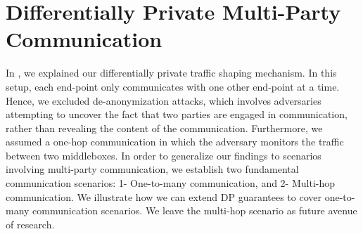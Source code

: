 \chapter{Differentially Private Multi-Party Communication}
In , we explained our differentially private traffic shaping mechanism. 
In this setup, each end-point only communicates with one other end-point at a time. 
Hence, we excluded de-anonymization attacks, which involves adversaries attempting to uncover the fact that two parties are engaged in communication, rather than revealing the content of the communication.
Furthermore, we assumed a one-hop communication in which the adversary monitors the traffic between two middleboxes.
In order to generalize our findings to scenarios involving multi-party communication, we establish two fundamental communication scenarios: 1- One-to-many communication, and 2- Multi-hop communication. 
We illustrate how we can extend DP guarantees to cover one-to-many communication scenarios.
We leave the multi-hop scenario as future avenue of research.


